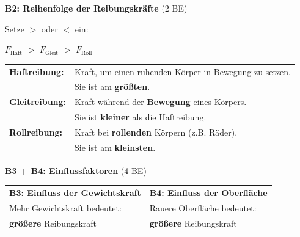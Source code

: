 \documentclass[a4paper,11pt]{article}
\newcommand{\lsg}[1]{\textcolor{loesung}{\textbf{#1}}}
\begin{document}
\vspace{3mm}


\textbf{B2: Reihenfolge der Reibungskräfte} \hfill (2 BE)

Setze $>$ oder $<$ ein:

\begin{center}
\Large
$F_{\text{Haft}}$ \lsg{$>$} $F_{\text{Gleit}}$ \lsg{$>$} $F_{\text{Roll}}$
\end{center}

\vspace{3mm}


\begin{tcolorbox}[colback=white, colframe=physik, boxrule=1.5pt, arc=0pt,
    title={\textbf{K2: Die drei Reibungsarten}}, fonttitle=\normalsize, coltitle=black, colbacktitle=white]

\begin{tabular}{@{}p{3.5cm}p{10cm}@{}}
\textbf{Haftreibung:} & Kraft, um einen ruhenden Körper in Bewegung zu setzen. \\[2mm]
& Sie ist am \lsg{größten}. \\[4mm]
\textbf{Gleitreibung:} & Kraft während der \lsg{Bewegung} eines Körpers. \\[2mm]
& Sie ist \lsg{kleiner} als die Haftreibung. \\[4mm]
\textbf{Rollreibung:} & Kraft bei \lsg{rollenden} Körpern (z.B. Räder). \\[2mm]
& Sie ist am \lsg{kleinsten}. \\
\end{tabular}

\end{tcolorbox}

\vspace{3mm}


\textbf{B3 + B4: Einflussfaktoren} \hfill (4 BE)

\begin{tabular}{@{}p{7.5cm}p{7.5cm}@{}}
\textbf{B3: Einfluss der Gewichtskraft} & \textbf{B4: Einfluss der Oberfläche} \\[2mm]
Mehr Gewichtskraft bedeutet: & Rauere Oberfläche bedeutet: \\[2mm]
\lsg{größere} Reibungskraft & \lsg{größere} Reibungskraft \\
\end{tabular}
\end{document}
